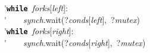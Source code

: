 \'\>\texttt{\textbf{while}}~\textit{forks}[\textit{left}]:\\

\'\>~~~~\textit{synch}.wait(?\textit{conds}[\textit{left}],~?\textit{mutex})\\

\'\>\texttt{\textbf{while}}~\textit{forks}[\textit{right}]:\\

\'\>~~~~\textit{synch}.wait(?\textit{conds}[\textit{right}],~?\textit{mutex})